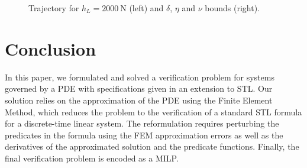 \documentclass[letterpaper, 10 pt, conference]{ieeeconf/ieeeconf}
\begin{document}

\begin{figure}[!t]
    \centering 
        \hfill
        \hfill
        \caption{Trajectory for $h_L = \SI{2000}{\newton}$ (left) and $\delta$,
        $\eta$ and $\nu$ bounds (right).}
    \label{fig:mech_evolution}
\end{figure}


\section{Conclusion}
\label{sec:conclusion}

In this paper, we formulated and solved a verification problem for systems governed by a
PDE with specifications given in an extension to STL. Our solution relies
on the approximation of the PDE using the Finite Element Method, which reduces
the problem to the verification of a standard STL formula for a discrete-time
linear system. The reformulation requires perturbing the predicates in the
formula using the FEM approximation errors as well as the derivatives of the
approximated solution and the predicate functions. Finally, the final
verification problem is encoded as a MILP.
\end{document}

